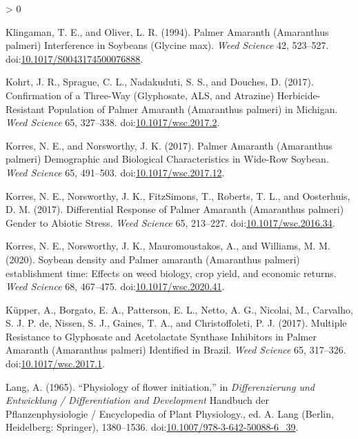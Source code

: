 \documentclass[utf8]{frontiersSCNS}
\newlength{\cslhangindent}
\newenvironment{CSLReferences}[2] %
 {%
  \setlength{\parindent}{0pt}
  \ifodd #1 \everypar{\setlength{\hangindent}{\cslhangindent}}\ignorespaces\fi
  \ifnum #2 > 0
  \setlength{\parskip}{#2\baselineskip}
  \fi
 }%
 {}
\begin{document}
\begin{CSLReferences}{1}{0}
\leavevmode\hypertarget{ref-klingaman1994}{}%
Klingaman, T. E., and Oliver, L. R. (1994). Palmer {Amaranth}
({Amaranthus} palmeri) {Interference} in {Soybeans} ({Glycine} max).
\emph{Weed Science} 42, 523--527.
doi:\href{https://doi.org/10.1017/S0043174500076888}{10.1017/S0043174500076888}.

\leavevmode\hypertarget{ref-kohrt2017}{}%
Kohrt, J. R., Sprague, C. L., Nadakuduti, S. S., and Douches, D. (2017).
Confirmation of a {Three}-{Way} ({Glyphosate}, {ALS}, and {Atrazine})
{Herbicide}-{Resistant Population} of {Palmer Amaranth} ({Amaranthus}
palmeri) in {Michigan}. \emph{Weed Science} 65, 327--338.
doi:\href{https://doi.org/10.1017/wsc.2017.2}{10.1017/wsc.2017.2}.

\leavevmode\hypertarget{ref-korres2017a}{}%
Korres, N. E., and Norsworthy, J. K. (2017). Palmer {Amaranth}
({Amaranthus} palmeri) {Demographic} and {Biological Characteristics} in
{Wide}-{Row Soybean}. \emph{Weed Science} 65, 491--503.
doi:\href{https://doi.org/10.1017/wsc.2017.12}{10.1017/wsc.2017.12}.

\leavevmode\hypertarget{ref-korres2017}{}%
Korres, N. E., Norsworthy, J. K., FitzSimons, T., Roberts, T. L., and
Oosterhuis, D. M. (2017). Differential {Response} of {Palmer Amaranth}
({Amaranthus} palmeri) {Gender} to {Abiotic Stress}. \emph{Weed Science}
65, 213--227.
doi:\href{https://doi.org/10.1017/wsc.2016.34}{10.1017/wsc.2016.34}.

\leavevmode\hypertarget{ref-korres2020}{}%
Korres, N. E., Norsworthy, J. K., Mauromoustakos, A., and Williams, M.
M. (2020). Soybean density and {Palmer} amaranth ({Amaranthus} palmeri)
establishment time: Effects on weed biology, crop yield, and economic
returns. \emph{Weed Science} 68, 467--475.
doi:\href{https://doi.org/10.1017/wsc.2020.41}{10.1017/wsc.2020.41}.

\leavevmode\hypertarget{ref-kupper2017}{}%
Küpper, A., Borgato, E. A., Patterson, E. L., Netto, A. G., Nicolai, M.,
Carvalho, S. J. P. de, Nissen, S. J., Gaines, T. A., and Christoffoleti,
P. J. (2017). Multiple {Resistance} to {Glyphosate} and {Acetolactate
Synthase Inhibitors} in {Palmer Amaranth} ({Amaranthus} palmeri)
{Identified} in {Brazil}. \emph{Weed Science} 65, 317--326.
doi:\href{https://doi.org/10.1017/wsc.2017.1}{10.1017/wsc.2017.1}.

\leavevmode\hypertarget{ref-lang1965}{}%
Lang, A. (1965). {``Physiology of flower initiation,''} in
\emph{Differenzierung und {Entwicklung} / {Differentiation} and
{Development}} Handbuch der {Pflanzenphysiologie} / {Encyclopedia} of
{Plant Physiology}., ed. A. Lang ({Berlin, Heidelberg}: {Springer}),
1380--1536.
doi:\href{https://doi.org/10.1007/978-3-642-50088-6_39}{10.1007/978-3-642-50088-6\_39}.


\end{CSLReferences}
\end{document}
